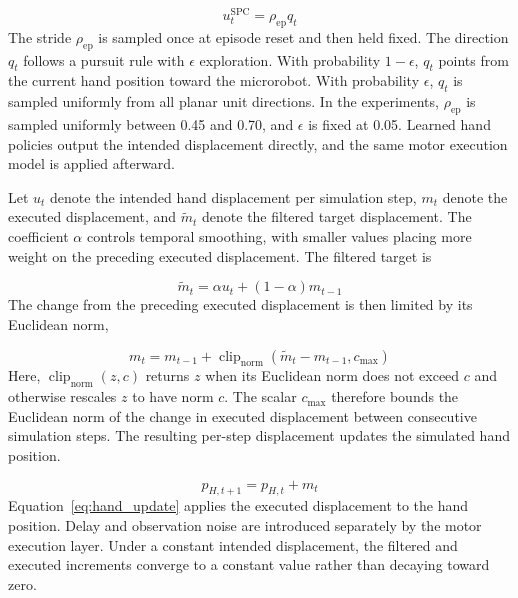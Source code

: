 \documentclass[journal,twoside,web]{ieeecolor2}
\begin{document}
\begin{equation}
u_t^{\mathrm{SPC}} = \rho_{\mathrm{ep}} q_t
\label{eq:spc_displacement}
\end{equation}
The stride $\rho_{\mathrm{ep}}$ is sampled once at episode reset and then held fixed. The direction $q_t$ follows a pursuit rule with $\epsilon$ exploration. With probability $1-\epsilon$, $q_t$ points from the current hand position toward the microrobot. With probability $\epsilon$, $q_t$ is sampled uniformly from all planar unit directions. In the experiments, $\rho_{\mathrm{ep}}$ is sampled uniformly between 0.45 and 0.70, and $\epsilon$ is fixed at 0.05. Learned hand policies output the intended displacement directly, and the same motor execution model is applied afterward.

Let $u_t$ denote the intended hand displacement per simulation step, $m_t$ denote the executed displacement, and $\widetilde{m}_t$ denote the filtered target displacement. The coefficient $\alpha$ controls temporal smoothing, with smaller values placing more weight on the preceding executed displacement. The filtered target is

\begin{equation}
\widetilde{m}_t = \alpha u_t + (1-\alpha)m_{t-1}
\label{eq:filtered_displacement}
\end{equation}
The change from the preceding executed displacement is then limited by its Euclidean norm,

\begin{equation}
m_t = m_{t-1} + \operatorname{clip}_{\mathrm{norm}}(\widetilde{m}_t-m_{t-1},c_{\max})
\label{eq:clipped_displacement}
\end{equation}
Here, $\operatorname{clip}_{\mathrm{norm}}(z,c)$ returns $z$ when its Euclidean norm does not exceed $c$ and otherwise rescales $z$ to have norm $c$. The scalar $c_{\max}$ therefore bounds the Euclidean norm of the change in executed displacement between consecutive simulation steps. The resulting per-step displacement updates the simulated hand position.

\begin{equation}
p_{H,t+1} = p_{H,t} + m_t
\label{eq:hand_update}
\end{equation}
Equation~\eqref{eq:hand_update} applies the executed displacement to the hand position. Delay and observation noise are introduced separately by the motor execution layer. Under a constant intended displacement, the filtered and executed increments converge to a constant value rather than decaying toward zero.
\end{document}
